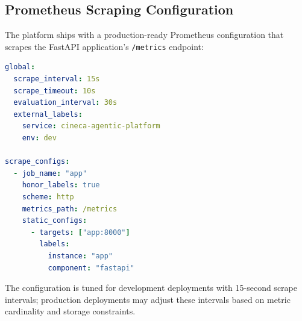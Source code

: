 \subsection{Prometheus Scraping Configuration}

The platform ships with a production-ready Prometheus configuration that scrapes the FastAPI application's \texttt{/metrics} endpoint:

\begin{lstlisting}[language=yaml, caption={Prometheus scrape configuration (ops/prometheus/prometheus.yml)}]
global:
  scrape_interval: 15s
  scrape_timeout: 10s
  evaluation_interval: 30s
  external_labels:
    service: cineca-agentic-platform
    env: dev

scrape_configs:
  - job_name: "app"
    honor_labels: true
    scheme: http
    metrics_path: /metrics
    static_configs:
      - targets: ["app:8000"]
        labels:
          instance: "app"
          component: "fastapi"
\end{lstlisting}

The configuration is tuned for development deployments with 15-second scrape intervals; production deployments may adjust these intervals based on metric cardinality and storage constraints.

